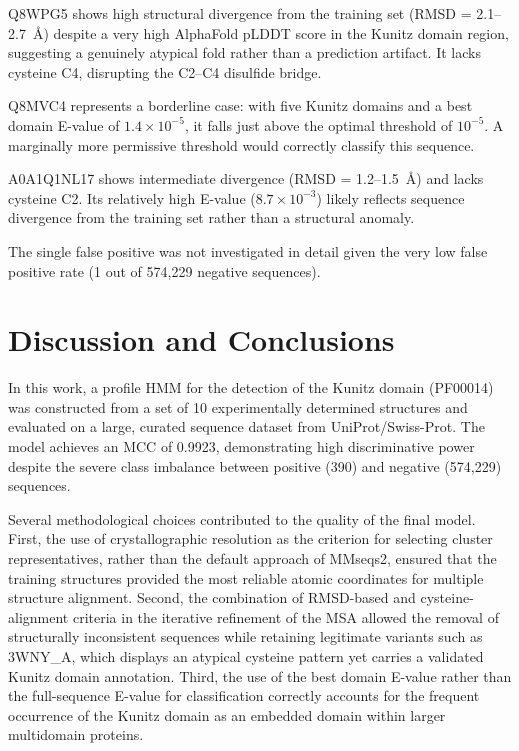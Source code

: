 \documentclass[11pt, a4paper]{article}
\begin{document}
Q8WPG5 shows high structural divergence from the training 
set (RMSD = 2.1--2.7~\AA) despite a very high AlphaFold 
pLDDT score in the Kunitz domain region, suggesting a 
genuinely atypical fold rather than a prediction artifact. 
It lacks cysteine C4, disrupting the C2--C4 disulfide bridge.

Q8MVC4 represents a borderline case: with five Kunitz 
domains and a best domain E-value of $1.4 \times 10^{-5}$, 
it falls just above the optimal threshold of $10^{-5}$. 
A marginally more permissive threshold would correctly 
classify this sequence.

A0A1Q1NL17 shows intermediate divergence (RMSD = 
1.2--1.5~\AA) and lacks cysteine C2. Its relatively high 
E-value ($8.7 \times 10^{-3}$) likely reflects sequence 
divergence from the training set rather than a structural 
anomaly.

The single false positive was not investigated in detail 
given the very low false positive rate (1 out of 
574{,}229 negative sequences).


\section{Discussion and Conclusions}

In this work, a profile HMM for the detection of the Kunitz 
domain (PF00014) was constructed from a set of 10 
experimentally determined structures and evaluated on a 
large, curated sequence dataset from UniProt/Swiss-Prot. 
The model achieves an MCC of 0.9923, demonstrating high 
discriminative power despite the severe class imbalance 
between positive (390) and negative (574{,}229) sequences.

Several methodological choices contributed to the quality 
of the final model. First, the use of crystallographic 
resolution as the criterion for selecting cluster 
representatives, rather than the default 
approach of MMseqs2, ensured that the training structures 
provided the most reliable atomic coordinates for multiple 
structure alignment. Second, the combination of 
RMSD-based and cysteine-alignment criteria in the iterative 
refinement of the MSA allowed the removal of structurally 
inconsistent sequences while retaining legitimate variants 
such as 3WNY\_A, which displays an atypical cysteine 
pattern yet carries a validated Kunitz domain annotation. 
Third, the use of the best domain E-value rather than the 
full-sequence E-value for classification correctly accounts 
for the frequent occurrence of the Kunitz domain as an 
embedded domain within larger multidomain proteins.
\end{document}
